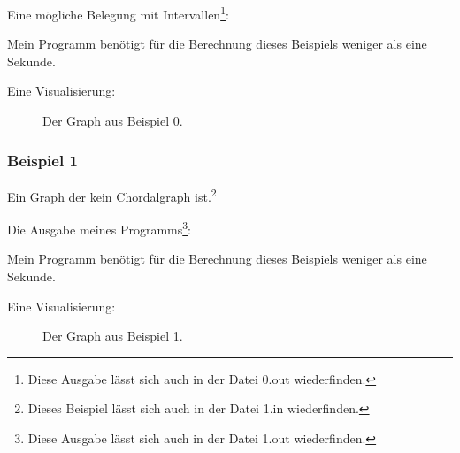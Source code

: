 {\small

}

Eine mögliche Belegung mit Intervallen\footnote{Diese Ausgabe lässt sich auch in der Datei 0.out wiederfinden.}:

{\small

}

Mein Programm benötigt für die Berechnung dieses Beispiels weniger als eine Sekunde.

Eine Visualisierung:

\begin{center}
\begin{figure}[h]
\caption{Der Graph aus Beispiel 0.}
\end{figure}
\end{center}


\subsubsection*{Beispiel 1}
Ein Graph der kein Chordalgraph ist.\footnote{Dieses Beispiel lässt sich auch in der Datei 1.in wiederfinden.}

{\small

}

Die Ausgabe meines Programms\footnote{Diese Ausgabe lässt sich auch in der Datei 1.out wiederfinden.}:

{\small

}

Mein Programm benötigt für die Berechnung dieses Beispiels weniger als eine Sekunde.

Eine Visualisierung:
\begin{center}
\begin{figure}[h]
\caption{Der Graph aus Beispiel 1.}
\end{figure}
\end{center}

